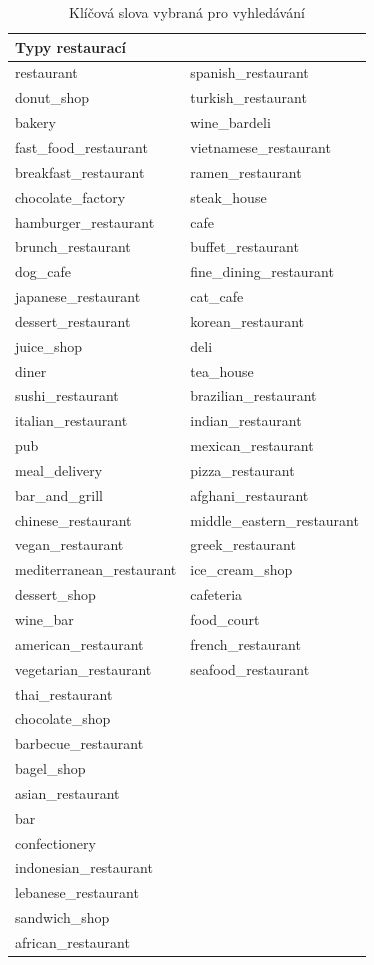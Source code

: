 \documentclass[12pt,a4paper]{report}
\begin{document}
\begin{table}[b!]
    \centering
    \begin{tabular}{l@{\hspace{1.5cm}}l}
    \toprule
    \textbf{Typy restaurací}\\
    \midrule
    restaurant & spanish\_restaurant \\
    donut\_shop & turkish\_restaurant \\
    bakery & wine\_bardeli \\
    fast\_food\_restaurant & vietnamese\_restaurant \\
    breakfast\_restaurant & ramen\_restaurant \\
    chocolate\_factory & steak\_house \\
    hamburger\_restaurant & cafe \\
    brunch\_restaurant & buffet\_restaurant \\
    dog\_cafe & fine\_dining\_restaurant \\
    japanese\_restaurant & cat\_cafe \\
    dessert\_restaurant & korean\_restaurant \\
    juice\_shop & deli \\
    diner & tea\_house \\
    sushi\_restaurant & brazilian\_restaurant \\
    italian\_restaurant & indian\_restaurant \\
    pub & mexican\_restaurant \\
    meal\_delivery & pizza\_restaurant \\
    bar\_and\_grill & afghani\_restaurant \\
    chinese\_restaurant & middle\_eastern\_restaurant \\
    vegan\_restaurant & greek\_restaurant \\
    mediterranean\_restaurant & ice\_cream\_shop \\
    dessert\_shop & cafeteria \\
    wine\_bar & food\_court \\
    american\_restaurant & french\_restaurant \\
    vegetarian\_restaurant & seafood\_restaurant \\
    thai\_restaurant &  \\
    chocolate\_shop &  \\
    barbecue\_restaurant &  \\
    bagel\_shop &  \\
    asian\_restaurant &  \\
    bar &  \\
    confectionery &  \\
    indonesian\_restaurant &  \\
    lebanese\_restaurant &  \\
    sandwich\_shop &  \\
    african\_restaurant &  \\
    \bottomrule
    \end{tabular}
    \caption{Klíčová slova vybraná pro vyhledávání }
    \label{tab:FoodEstablishmentTypes}
\end{table}
\end{document}
